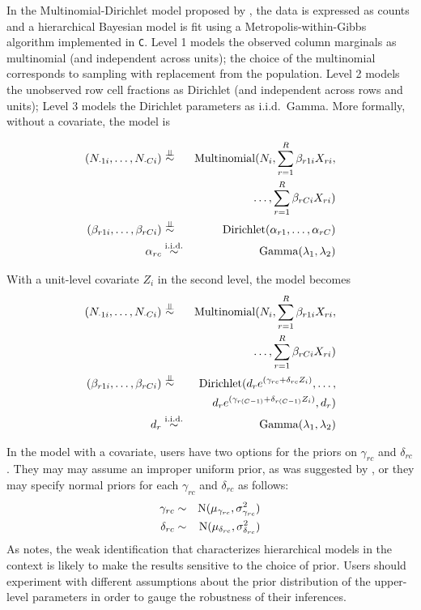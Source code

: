 In the Multinomial-Dirichlet model proposed by \citet{RosJiaKin01},
the data is expressed as counts and a hierarchical Bayesian model is fit
using a Metropolis-within-Gibbs algorithm implemented in {\tt C}.
Level 1 models the observed column marginals as multinomial (and
independent across units); the choice of the multinomial corresponds
to sampling with replacement from the population.  Level 2 models the
unobserved row cell fractions as Dirichlet (and independent across
rows and units); Level 3 models the Dirichlet parameters as
i.i.d.\ Gamma.  More formally, without a covariate, the model is

\begin{eqnarray*}
(N_{\cdot 1i}, \dots, N_{\cdot Ci}) &\stackrel{\indep}{\sim}& {\rm
Multinomial}(N_i, \sum_{r=1}^R \beta_{r1i}X_{ri},\\ 
 & & \quad \dots, \sum_{r=1}^R \beta_{rCi}X_{ri}) \\
(\beta_{r1i}, \dots, \beta_{rCi}) &\stackrel{\indep}{\sim}& {\rm Dirichlet}(\alpha_{r1}, \dots, \alpha_{rC})\\
\alpha_{rc} &\stackrel{\rm i.i.d.}{\sim}& {\rm Gamma}(\lambda_1,\lambda_2) 
\end{eqnarray*}

With a unit-level covariate $Z_i$ in the second level, the model becomes
\begin{eqnarray*}
(N_{\cdot 1i}, \dots, N_{\cdot Ci}) &\stackrel{\indep}{\sim}& {\rm
Multinomial}(N_i, \sum_{r=1}^R \beta_{r1i}X_{ri},\\
 & & \quad \dots, \sum_{r=1}^R \beta_{rCi}X_{ri}) \\
(\beta_{r1i}, \dots, \beta_{rCi}) &\stackrel{\indep}{\sim}& {\rm
Dirichlet}(d_r e^{(\gamma_{rc} + \delta_{rc}Z_i)}, \dots, \\
& & \quad  d_r e^{(\gamma_{r(C-1)} +
\delta_{r(C-1)}Z_i)}, d_r ) \\
d_r &\stackrel{\rm i.i.d.}{\sim}& {\rm Gamma}(\lambda_1, \lambda_2)  
\end{eqnarray*}

In the model with a covariate, users have two options for the priors
on $\gamma_{rc}$ and $\delta_{rc}$ .  They may may assume an improper
uniform prior, as was
suggested by \citet{RosJiaKin01}, or they may specify normal priors
for each $\gamma_{rc}$ and $\delta_{rc}$ as follows:
\begin{eqnarray*}
\gamma_{rc} & \sim & {\rm N}(\mu_{\gamma_{rc}},
\sigma_{\gamma_{rc}}^2)\\
\delta_{rc} & \sim & {\rm N}(\mu_{\delta_{rc}}, \sigma_{\delta_{rc}}^2)   
\end{eqnarray*}
As \citet{Wakefield04} notes, the weak identification that
characterizes hierarchical models in the  context is
likely to make the results sensitive to the choice of prior.  Users
should experiment with different assumptions about the prior
distribution of the upper-level parameters in order to gauge the
robustness of their inferences.

